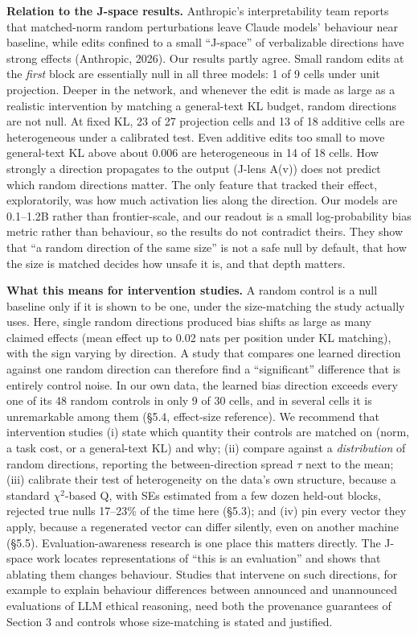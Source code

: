 \documentclass[
  10pt,
]{article}
\begin{document}
\textbf{Relation to the J-space results.} Anthropic's interpretability
team reports that matched-norm random perturbations leave Claude models'
behaviour near baseline, while edits confined to a small ``J-space'' of
verbalizable directions have strong effects (Anthropic, 2026). Our
results partly agree. Small random edits at the \emph{first} block are
essentially null in all three models: 1 of 9 cells under unit
projection. Deeper in the network, and whenever the edit is made as
large as a realistic intervention by matching a general-text KL budget,
random directions are not null. At fixed KL, 23 of 27 projection cells
and 13 of 18 additive cells are heterogeneous under a calibrated test.
Even additive edits too small to move general-text KL above about 0.006
are heterogeneous in 14 of 18 cells. How strongly a direction propagates
to the output (J-lens A(v)) does not predict which random directions
matter. The only feature that tracked their effect, exploratorily, was
how much activation lies along the direction. Our models are 0.1--1.2B
rather than frontier-scale, and our readout is a small log-probability
bias metric rather than behaviour, so the results do not contradict
theirs. They show that ``a random direction of the same size'' is not a
safe null by default, that how the size is matched decides how unsafe it
is, and that depth matters.

\textbf{What this means for intervention studies.} A random control is a
null baseline only if it is shown to be one, under the size-matching the
study actually uses. Here, single random directions produced bias shifts
as large as many claimed effects (mean \textbar effect\textbar{} up to
0.02 nats per position under KL matching), with the sign varying by
direction. A study that compares one learned direction against one
random direction can therefore find a ``significant'' difference that is
entirely control noise. In our own data, the learned bias direction
exceeds every one of its 48 random controls in only 9 of 30 cells, and
in several cells it is unremarkable among them (§5.4, effect-size
reference). We recommend that intervention studies (i) state which
quantity their controls are matched on (norm, a task cost, or a
general-text KL) and why; (ii) compare against a \emph{distribution} of
random directions, reporting the between-direction spread $\tau$ next to the
mean; (iii) calibrate their test of heterogeneity on the data's own
structure, because a standard $\chi^2$-based Q, with SEs estimated from a few
dozen held-out blocks, rejected true nulls 17--23\% of the time here
(§5.3); and (iv) pin every vector they apply, because a regenerated
vector can differ silently, even on another machine (§5.5).
Evaluation-awareness research is one place this matters directly. The
J-space work locates representations of ``this is an evaluation'' and
shows that ablating them changes behaviour. Studies that intervene on
such directions, for example to explain behaviour differences between
announced and unannounced evaluations of LLM ethical reasoning, need
both the provenance guarantees of Section 3 and controls whose
size-matching is stated and justified.
\end{document}

